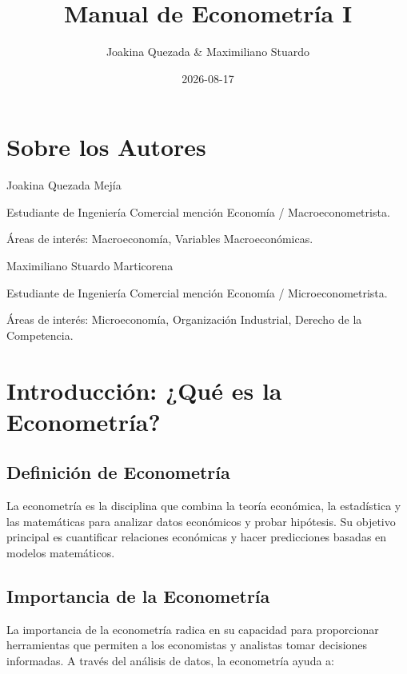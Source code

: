 \documentclass[
]{book}
\title{Manual de Econometría I}
\author{Joakina Quezada \& Maximiliano Stuardo}
\date{2026-08-17}
\begin{document}
\maketitle

{
\setcounter{tocdepth}{1}
\tableofcontents
}
\chapter*{Sobre los Autores}\label{sobre-los-autores}

Joakina Quezada Mejía

Estudiante de Ingeniería Comercial mención Economía / Macroeconometrista.

Áreas de interés: Macroeconomía, Variables Macroeconómicas.

Maximiliano Stuardo Marticorena

Estudiante de Ingeniería Comercial mención Economía / Microeconometrista.

Áreas de interés: Microeconomía, Organización Industrial, Derecho de la Competencia.

\chapter*{Introducción: ¿Qué es la Econometría?}\label{introducciuxf3n-quuxe9-es-la-econometruxeda}

\section*{Definición de Econometría}\label{definiciuxf3n-de-econometruxeda}

La econometría es la disciplina que combina la teoría económica, la estadística y las matemáticas para analizar datos económicos y probar hipótesis. Su objetivo principal es cuantificar relaciones económicas y hacer predicciones basadas en modelos matemáticos.

\section*{Importancia de la Econometría}\label{importancia-de-la-econometruxeda}

La importancia de la econometría radica en su capacidad para proporcionar herramientas que permiten a los economistas y analistas tomar decisiones informadas. A través del análisis de datos, la econometría ayuda a:
\end{document}
